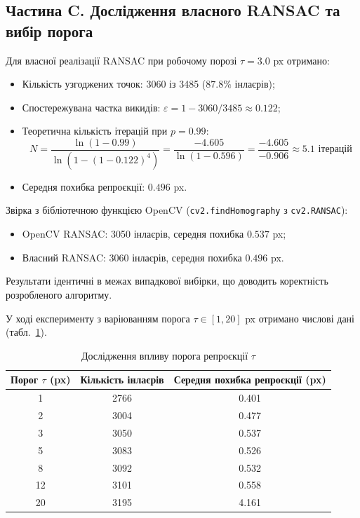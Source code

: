 \documentclass[14pt, a4paper]{article}
\begin{document}
\begin{figure}[h!]
\centering
{}
\end{figure}

\subsection{Частина C. Дослідження власного RANSAC та вибір порога}
Для власної реалізації RANSAC при робочому порозі $\tau = 3.0$ px отримано:
\begin{itemize}
    \item Кількість узгоджених точок: 3060 із 3485 ($87.8\%$ інлаєрів);
    \item Спостережувана частка викидів: $\varepsilon = 1 - 3060/3485 \approx 0.122$;
    \item Теоретична кількість ітерацій при $p=0.99$:
    \begin{equation*}
        N = \frac{\ln(1 - 0.99)}{\ln(1 - (1 - 0.122)^4)} = \frac{-4.605}{\ln(1 - 0.596)} = \frac{-4.605}{-0.906} \approx 5.1 \text{ ітерацій}
    \end{equation*}
    \item Середня похибка репроєкції: $0.496$ px.
\end{itemize}

Звірка з бібліотечною функцією OpenCV (\texttt{cv2.findHomography} з \texttt{cv2.RANSAC}):
\begin{itemize}
    \item OpenCV RANSAC: 3050 інлаєрів, середня похибка $0.537$ px;
    \item Власний RANSAC: 3060 інлаєрів, середня похибка $0.496$ px.
\end{itemize}
Результати ідентичні в межах випадкової вибірки, що доводить коректність розробленого алгоритму.

У ході експерименту з варіюванням порога $\tau \in [1, 20]$ px отримано числові дані (табл.~\ref{tab:tau}).

\begin{table}[h!]
\centering
\caption{Дослідження впливу порога репроєкції $\tau$}
\label{tab:tau}
\begin{tabular}{ccc}
\toprule
\textbf{Порог $\tau$ (px)} & \textbf{Кількість інлаєрів} & \textbf{Середня похибка репроєкції (px)} \\
\midrule
1 & 2766 & 0.401 \\
2 & 3004 & 0.477 \\
3 & 3050 & 0.537 \\
5 & 3083 & 0.526 \\
8 & 3092 & 0.532 \\
12 & 3101 & 0.558 \\
20 & 3195 & 4.161 \\
\bottomrule
\end{tabular}
\end{table}
\end{document}
